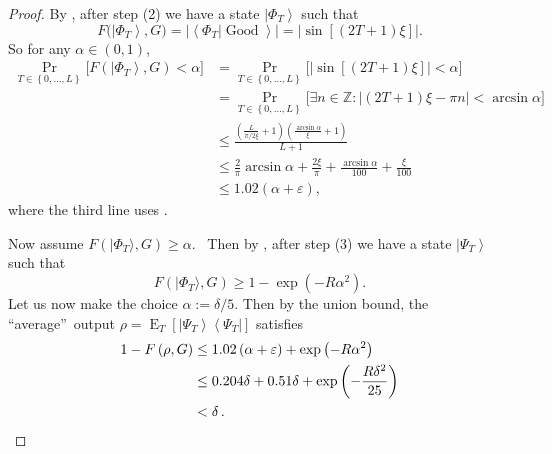 \begin{proof}
By , after step (2) we have a state $\left\vert \Phi
_{T}\right\rangle $ such that
\[
F\bigl(  \left\vert \Phi_{T}\right\rangle ,G\bigr)  =\bigl\vert \left\langle
\Phi_{T}|\operatorname*{Good}\right\rangle \bigr\vert =\bigl\vert \sin\left[
\left(  2T+1\right)  \xi\right]  \bigr\vert .
\]
So for any $\alpha\in\left(  0,1\right)  $,%
\begin{align*}
\Pr_{T\in\left\{  0,\ldots,L\right\}  }\bigl[  F\left(  \left\vert \Phi
_{T}\right\rangle ,G\right)  <\alpha\bigr]   &  =\Pr_{T\in\left\{
0,\ldots,L\right\}  }\bigl[  \left\vert \sin\left[  \left(  2T+1\right)
\xi\right]  \right\vert <\alpha\bigr]  \\
&  =\Pr_{T\in\left\{  0,\ldots,L\right\}  }\bigl[  \exists n\in\mathbb{Z}%
:\left\vert \left(  2T+1\right)  \xi-\pi n\right\vert <\arcsin\alpha\bigr]
\\
&  \leq\frac{\left(  \frac{L}{\pi/2\xi}+1\right)  \left(  \frac{\arcsin\alpha
}{\xi}+1\right)  }{L+1}\\
&  \leq\frac{2}{\pi}\arcsin\alpha+\frac{2\xi}{\pi}+\frac{\arcsin\alpha}%
{100}+\frac{\xi}{100}\\[1ex]
&  \leq1.02\left(  \alpha+\varepsilon\right)  ,
\end{align*}
where the third line uses .

Now assume $F(\vert \Phi_{T}\rangle ,G)  \geq\alpha$.
\ Then by , after step (3) we have a state $\left\vert
\Psi_{T}\right\rangle $ such that%
\[
F(\vert \Phi_{T}\rangle ,G)  \geq1-\exp\left(
-R\alpha^{2}\right)  .
\]
Let us now make the choice $\alpha:=\delta/5$. Then by the union bound, the
\textquotedblleft average\textquotedblright\ output $\rho=\operatorname*{E}%
_{T}\left[  \left\vert \Psi_{T}\right\rangle \left\langle \Psi_{T}\right\vert
\right]  $ satisfies%
\begin{align*}
1-F\left(  \rho,G\right)   &  \leq1.02\left(  \alpha+\varepsilon\right)
+\exp\left(  -R\alpha^{2}\right) \\
&  \leq0.204\delta+0.51\delta+\exp\left(  -\frac{R\delta^{2}}{25}\right) \\
&  <\delta\,.\qedhere
\end{align*}
\end{proof}
